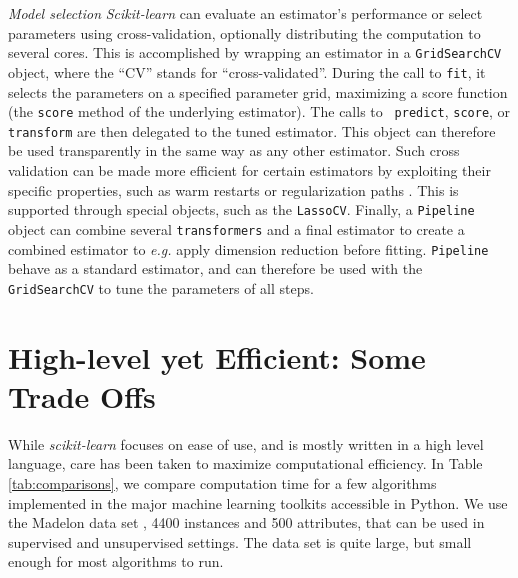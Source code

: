\documentclass[twoside,11pt]{article}
\begin{document}
\emph{Model selection}
%
\emph{Scikit-learn} can evaluate an estimator's performance or select
parameters using cross-validation, optionally distributing the
computation to several cores.
This is accomplished by wrapping an estimator in a {\tt GridSearchCV}
object, where the ``CV'' stands for ``cross-validated''.
During the call to {\tt fit}, it selects the parameters
on a specified parameter grid, maximizing a score function
(the {\tt score} method of the underlying estimator). The calls to {\tt
predict}, {\tt score}, or {\tt transform} are then delegated to the tuned
estimator. This object can therefore be used transparently in the same
way as any other
estimator.
Such cross validation can be made more efficient for certain
estimators by exploiting their specific properties, such as warm restarts
or regularization paths \citep{friedman2010}. This is supported through special
objects, such as the {\tt LassoCV}.
%
Finally, a {\tt Pipeline} object can
combine several {\tt transformers} and a final estimator to create a
combined estimator to \emph{e.g.} apply dimension reduction before
fitting. {\tt Pipeline} behave as a standard estimator, and can
therefore be used
with the {\tt GridSearchCV} to tune the parameters of all steps.

\section{High-level yet Efficient: Some Trade Offs}

While \emph{scikit-learn} focuses on ease of use, and is
mostly written in a high level language, care has been taken to maximize
computational efficiency. In Table \ref{tab:comparisons}, we compare
computation time for a few algorithms implemented in the major machine
learning toolkits accessible in Python. We use the Madelon data
set \citep{Guyon2004}, 4400 instances and 500 attributes,
that can be used in supervised
and unsupervised settings.  The data set is quite large, but small enough for most
algorithms to run.
\end{document}
